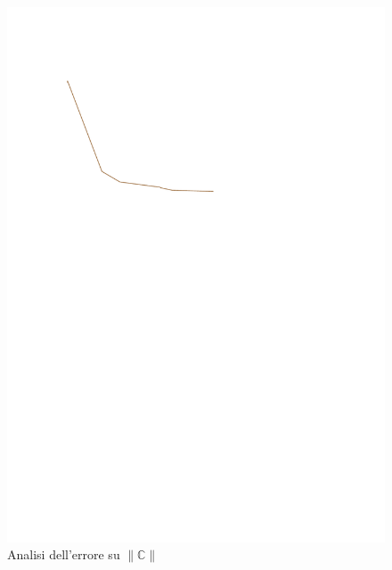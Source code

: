 \documentclass[a4paper,num-refs]{oup-contemporary}
\begin{document}
\begin{figure}[bt!] %
	\centering
	\includegraphics[width=\linewidth]{test_data.pdf}
	\caption{Analisi dell'errore su $\|\mathbb C\|$}\label{fig:convergence1}
\end{figure}
\end{document}
